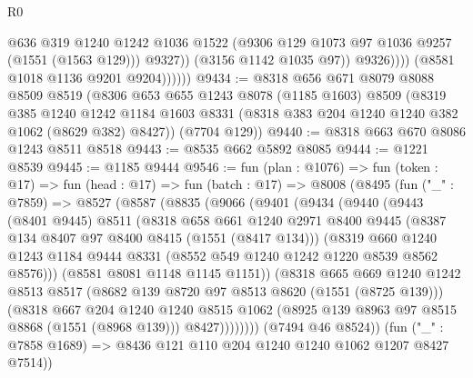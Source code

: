\begin{lexlean}{R0}
\begin{coremodule}
                            @636
                            @319
                            @1240
                            @1242
                            @1036
                            @1522
                            (@9306 @129 @1073 @97 @1036 @9257 (@1551 (@1563 @129)))
                            @9327))
                        (@3156 @1142 @1035 @97))
                      @9326))))
              (@8581 @1018 @1136 @9201 @9204))))))
@9434 := @8318
    @656
    @671
    @8079
    @8088
    @8509
    @8519
    (@8306
      @653
      @655
      @1243
      @8078
      (@1185 @1603)
      @8509
      (@8319
        @385
        @1240
        @1242
        @1184
        @1603
        @8331
        (@8318 @383 @204 @1240 @1240 @382 @1062 (@8629 @382) @8427))
      (@7704 @129))
@9440 := @8318 @663 @670 @8086 @1243 @8511 @8518
@9443 := @8535 @662 @5892 @8085
@9444 := @1221 @8539
@9445 := @1185 @9444
@9546 := fun (plan : @1076) =>
  fun (token : @17) =>
  fun (head : @17) =>
  fun (batch : @17) =>
  @8008
    (@8495
      (fun ("_" : @7859) =>
      @8527
        (@8587
          (@8835
            (@9066
              (@9401
                (@9434
                  (@9440
                    (@9443
                      (@8401 @9445)
                      @8511
                      (@8318
                        @658
                        @661
                        @1240
                        @2971
                        @8400
                        @9445
                        (@8387 @134 @8407 @97 @8400 @8415 (@1551 (@8417 @134)))
                        (@8319
                          @660
                          @1240
                          @1243
                          @1184
                          @9444
                          @8331
                          (@8552 @549 @1240 @1242 @1220 @8539 @8562 @8576)))
                      (@8581 @8081 @1148 @1145 @1151))
                    (@8318
                      @665
                      @669
                      @1240
                      @1242
                      @8513
                      @8517
                      (@8682 @139 @8720 @97 @8513 @8620 (@1551 (@8725 @139)))
                      (@8318
                        @667
                        @204
                        @1240
                        @1240
                        @8515
                        @1062
                        (@8925 @139 @8963 @97 @8515 @8868 (@1551 (@8968 @139)))
                        @8427))))))))
        (@7494 @46 @8524))
      (fun ("_" : @7858 @1689) => @8436 @121 @110 @204 @1240 @1240 @1062 @1207 @8427 @7514))

\end{coremodule}
\end{lexlean}
